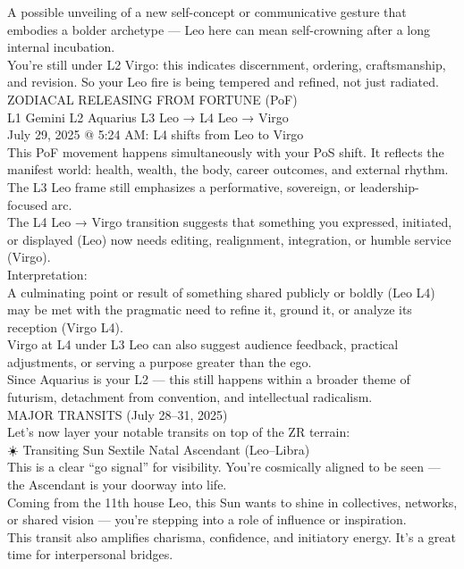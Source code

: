 \documentclass{article}
\begin{document}
A possible unveiling of a new self-concept or communicative gesture that embodies a bolder archetype --- Leo here can mean self-crowning after a long internal incubation.\\
You're still under L2 Virgo: this indicates discernment, ordering, craftsmanship, and revision. So your Leo fire is being tempered and refined, not just radiated.\\
ZODIACAL RELEASING FROM FORTUNE (PoF)\\
L1 Gemini L2 Aquarius L3 Leo → L4 Leo → Virgo\\
July 29, 2025 @ 5:24 AM: L4 shifts from Leo to Virgo\\
This PoF movement happens simultaneously with your PoS shift. It reflects the manifest world: health, wealth, the body, career outcomes, and external rhythm.\\
The L3 Leo frame still emphasizes a performative, sovereign, or leadership-focused arc.\\
The L4 Leo → Virgo transition suggests that something you expressed, initiated, or displayed (Leo) now needs editing, realignment, integration, or humble service (Virgo).\\
Interpretation:\\
A culminating point or result of something shared publicly or boldly (Leo L4) may be met with the pragmatic need to refine it, ground it, or analyze its reception (Virgo L4).\\
Virgo at L4 under L3 Leo can also suggest audience feedback, practical adjustments, or serving a purpose greater than the ego.\\
Since Aquarius is your L2 --- this still happens within a broader theme of futurism, detachment from convention, and intellectual radicalism.\\
MAJOR TRANSITS (July 28--31, 2025)\\
Let's now layer your notable transits on top of the ZR terrain:\\
☀️ Transiting Sun Sextile Natal Ascendant (Leo--Libra)\\
This is a clear ``go signal'' for visibility. You're cosmically aligned to be seen --- the Ascendant is your doorway into life.\\
Coming from the 11th house Leo, this Sun wants to shine in collectives, networks, or shared vision --- you're stepping into a role of influence or inspiration.\\
This transit also amplifies charisma, confidence, and initiatory energy. It's a great time for interpersonal bridges.\\
\end{document}

